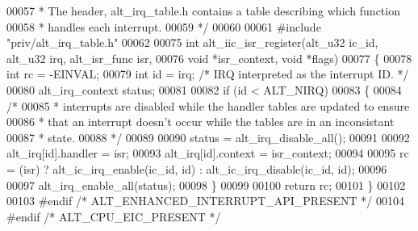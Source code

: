 \begin{DoxyCode}
00057 \textcolor{comment}{ * The header, alt\_irq\_table.h contains a table describing which function}
00058 \textcolor{comment}{ * handles each interrupt.}
00059 \textcolor{comment}{ */}
00060 
00061 \textcolor{preprocessor}{#include "priv/alt_irq_table.h"}
00062 
00075 \textcolor{keywordtype}{int} alt_iic_isr_register(alt_u32 ic\_id, alt_u32 irq, alt_isr_func isr, 
00076   \textcolor{keywordtype}{void} *isr\_context, \textcolor{keywordtype}{void} *flags)
00077 \{
00078   \textcolor{keywordtype}{int} rc = -EINVAL;  
00079   \textcolor{keywordtype}{int} \textcolor{keywordtype}{id} = irq;             \textcolor{comment}{/* IRQ interpreted as the interrupt ID. */}
00080   alt_irq_context status;
00081 
00082   \textcolor{keywordflow}{if} (\textcolor{keywordtype}{id} < ALT_NIRQ)
00083   \{
00084     \textcolor{comment}{/* }
00085 \textcolor{comment}{     * interrupts are disabled while the handler tables are updated to ensure}
00086 \textcolor{comment}{     * that an interrupt doesn't occur while the tables are in an inconsistant}
00087 \textcolor{comment}{     * state.}
00088 \textcolor{comment}{     */}
00089 
00090     status = alt_irq_disable_all();
00091 
00092     alt_irq[id].handler = isr;
00093     alt_irq[id].context = isr\_context;
00094 
00095     rc = (isr) ? alt\_ic\_irq\_enable(ic\_id, \textcolor{keywordtype}{id}) : alt\_ic\_irq\_disable(ic\_id, \textcolor{keywordtype}{id});
00096 
00097     alt_irq_enable_all(status);
00098   \}
00099 
00100   \textcolor{keywordflow}{return} rc; 
00101 \}
00102 
00103 \textcolor{preprocessor}{#endif }\textcolor{comment}{/* ALT\_ENHANCED\_INTERRUPT\_API\_PRESENT */}\textcolor{preprocessor}{}
00104 \textcolor{preprocessor}{#endif }\textcolor{comment}{/* ALT\_CPU\_EIC\_PRESENT */}\textcolor{preprocessor}{}
\end{DoxyCode}
